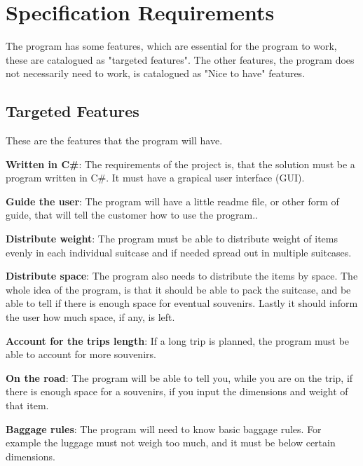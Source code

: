 \section{Specification Requirements}
\label{sec:Spec}
The program has some features, which are essential for the program to work, these are catalogued as "targeted features". The other features, the program does not necessarily need to work, is catalogued as "Nice to have" features.
\newline

\subsection{Targeted Features}
These are the features that the program will have. 


\textbf{Written in C\#}:
The requirements of the project is, that the solution must be a program written in C\#. It must have a grapical user interface (GUI).

\textbf{Guide the user}:
The program will have a little readme file, or other form of guide, that will tell the customer how to use the program..
\newline

\textbf{Distribute weight}:
The program must be able to distribute weight of items evenly in each individual suitcase and if needed spread out in multiple suitcases.
\newline

\textbf{Distribute space}:
The program also needs to distribute the items by space. The whole idea of the program, is that it should be able to pack the suitcase, and be able to tell if there is enough space for eventual souvenirs. Lastly it should inform the user how much space, if any, is left.
\newline

\textbf{Account for the trips length}:
If a long trip is planned, the program must be able to account for more souvenirs.
\newline

\textbf{On the road}:
The program will be able to tell you, while you are on the trip, if there is enough space for a souvenirs, if you input the dimensions and weight of that item. 
\newline

\textbf{Baggage rules}:
The program will need to know basic baggage rules. For example the luggage must not weigh too much, and it must be below certain dimensions. 
\newline

